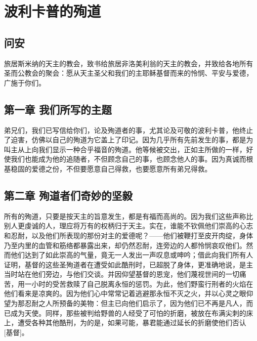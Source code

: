 
\chapter{波利卡普的殉道}



\section{问安}

旅居斯米纳的天主的教会，致书给旅居非洛美利翁的天主的教会，并致给各地所有圣而公教会的聚会：愿从天主圣父和我们的主耶稣基督而来的怜悯、平安与爱德，广施于你们。\par


\section{第一章 我们所写的主题}

弟兄们，我们已写信给你们，论及殉道者的事，尤其论及可敬的波利卡普，他终止了迫害，仿佛以自己的殉道为它盖上了印记。因为几乎所有先前发生的事，都是为叫主从上向我们显示一种合乎福音的殉道。他等候被交出，正如主所做的一样，好使我们也能成为他的追随者，不但顾念自己的事，也顾念他人的事。因为真诚而根基稳固的爱德之份，不但要愿意自己得救，也要愿意所有弟兄得救。\par


\section{第二章 殉道者们奇妙的坚毅}

所有的殉道，只要是按天主的旨意发生，都是有福而高尚的。因为我们这些声称比别人更虔诚的人，理应将万有的权柄归于天主。实在，谁能不钦佩他们崇高的心志和忍耐，以及他们所表现的那份对主的爱德呢？——他们被鞭打至皮开肉绽，身体乃至内里的血管和筋络都暴露出来，却仍然忍耐，连旁边的人都怜悯哀叹他们。然而他们达到了如此崇高的气量，竟无一人发出一声叹息或呻吟；借此向我们所有人证明，基督的这些圣殉道者在遭受如此酷刑时，已超脱了身体，更准确地说，是主当时站在他们旁边，与他们交谈。并因仰望基督的恩宠，他们蔑视世间的一切痛苦，用一小时的受苦救赎了自己脱离永恒的惩罚。为此，他们野蛮行刑者的火焰在他们看来是凉爽的。因为他们心中常常记着逃避那永恒不灭之火，并以心灵之眼仰望为那忍耐之人所预备的美物：但主已向他们启示了，因为他们已不再是凡人，而已成为天使。同样，那些被判给野兽的人经受了可怕的折磨，被放在布满尖刺的床上，遭受各种其他酷刑，为的是，如果可能，暴君能通过延长的折磨使他们否认[基督]。\par

